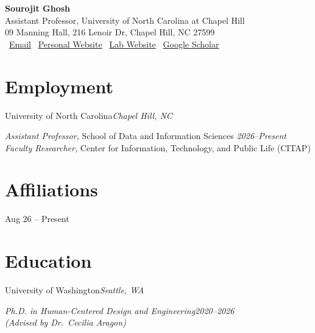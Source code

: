 \documentclass[10pt, letterpaper]{article}
\begin{document}
\pagestyle{empty}

\begin{center}
  {\LARGE\bfseries Sourojit Ghosh}\\[5pt]
  {\large Assistant Professor, University of North Carolina at Chapel Hill \\09 Manning Hall, 216 Lenoir Dr, Chapel Hill, NC 27599}\\[6pt]
  
  \faEnvelope\ \href{mailto:ghosh100@unc.edu}{Email}\quad
  \faGlobe\ \href{https://sourojitghosh.github.io/}{Personal Website} \quad
  \faGlobe\ \href{https://sourojitghosh.github.io/unseen-lab/}{Lab Website} \quad
  \faGoogle\ \href{https://scholar.google.com/citations?user=fNxrh48AAAAJ&hl=en&authuser=2}{Google Scholar} 
  \\[6pt]
\end{center}

\vspace{5pt}

\section{Employment}

\noindent\large{University of North Carolina}\hfill\textcolor{tagbg}{\textit{Chapel Hill, NC}}\par
\noindent\textit{Assistant Professor,} School of Data and Information Sciences \hfill\textcolor{tagbg}{\textit{2026--Present}}\\
\textit{Faculty Researcher,} Center for Information, Technology, and Public Life (CITAP)

\section{Affiliations} 

\hfill{Aug 26 -- Present}

\section{Education}

\noindent\large{University of Washington}\hfill\textcolor{uwpurple}{\textit{Seattle, WA}}\par
\noindent\textit{Ph.D. in Human-Centered Design and Engineering}\hfill\textcolor{uwpurple}{\textit{2020--2026}}\\
\textit{(Advised by Dr.\ Cecilia Aragon)}\\
\end{document}
